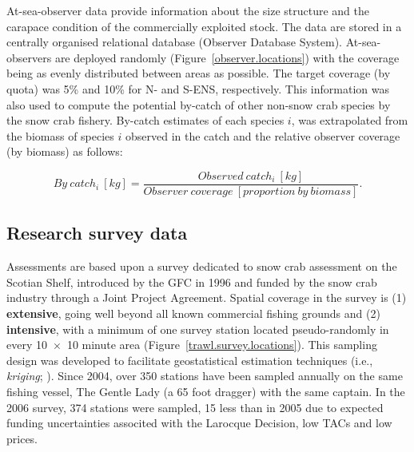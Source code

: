 \documentclass[11pt]{article}
\newcommand{\mult}{$\times$}
\begin{document}
At-sea-observer data provide information about the size structure and the carapace condition of the commercially exploited stock. The data are stored in a centrally organised relational database (Observer Database System). At-sea-observers are deployed randomly (Figure~\ref{observer.locations}) with the coverage being as evenly distributed between areas as possible. The target coverage (by quota) was 5\% and 10\% for N- and S-ENS, respectively. This information was also used to compute the potential by-catch of other non-snow crab species by the snow crab fishery. By-catch estimates of each species $i$, was extrapolated from the biomass of species $i$ observed in the catch and the relative observer coverage (by biomass) as follows:

\begin{equation}
  By \: catch_{i} \: [kg] = \dfrac{ Observed \: catch_{i} \: [kg] } { Observer \: coverage \: [proportion \: by \: biomass]} .
\end{equation}


\subsection{Research survey data}

Assessments are based upon a survey dedicated to snow crab assessment on the Scotian Shelf, introduced by the GFC in 1996 \citep{Biron1997} and funded by the snow crab industry through a Joint Project Agreement. Spatial coverage in the survey is (1) \textbf{extensive}, going well beyond all known commercial fishing grounds and (2) \textbf{intensive}, with a minimum of one survey station located pseudo-randomly in every 10~\mult~10 minute area (Figure~\ref{trawl.survey.locations}). This sampling design was developed to facilitate geostatistical estimation techniques (i.e., \textit{kriging}; \citealt{Cressie1993, legendre1998, Kern2000}). Since 2004, over 350 stations have been sampled annually on the same fishing vessel, The Gentle Lady (a 65 foot dragger) with the same captain. In the 2006 survey, 374 stations were sampled, 15 less than in 2005 due to expected funding uncertainties associted with the Larocque Decision, low TACs and low prices.
\end{document}
